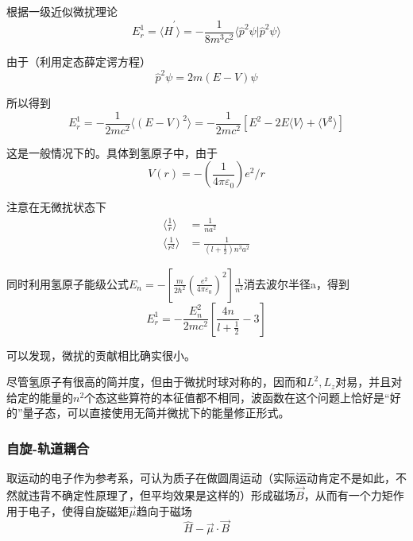 \documentclass[UTF8]{ctexart}
\begin{document}
\noindent 根据一级近似微扰理论
\begin{equation}
    E_r^1 = \langle \hat{H}^{\prime} \rangle = - \frac{1}{8 m^3 c^2} \langle \hat{p}^2\psi | \hat{p}^2 \psi  \rangle  
\end{equation}

\noindent 由于（利用定态薛定谔方程）
\begin{equation}
    \hat{p}^2 \psi = 2m(E-V) \psi 
\end{equation}

\noindent 所以得到
\begin{equation}
    E_r^1 = - \frac{1}{2mc^2} \langle (E-V)^2 \rangle  = -\frac{1}{2mc^2}\left[E^2 - 2E\langle V \rangle +\langle V^2 \rangle \right]
\end{equation}

    这是一般情况下的。具体到氢原子中，由于
    \begin{equation}
        V(r) = - \left(\frac{1}{4 \pi \varepsilon_0}\right) e^2/r
    \end{equation}

\noindent 注意在无微扰状态下
\begin{equation}
    \begin{aligned}
        \langle \frac{1}{r} \rangle  &= \frac{1}{na^2} \\ 
        \langle \frac{1}{r^2} \rangle &= \frac{1}{\left(l+\frac{1}{2}\right) n^3 a^2}
    \end{aligned}
\end{equation}

\noindent 同时利用氢原子能级公式$E_n = -\left[\frac{m}{2\hbar^2}\left(\frac{e^2}{4 \pi \varepsilon_0}\right)^2\right] \frac{1}{n^2}$消去波尔半径a，得到 
\begin{equation}
    E_r^1 = - \frac{E_n^2}{2 m c^2} \left[\frac{4n}{l+\frac{1}{2}} - 3\right]\label{equ6.9}
\end{equation}

\noindent 可以发现，微扰的贡献相比确实很小。

    尽管氢原子有很高的简并度，但由于微扰时球对称的，因而和$L^2,L_z$对易，并且对给定的能量的$n^2$个态这些算符的本征值都不相同，波函数在这个问题上恰好是“好的”量子态，可以直接使用无简并微扰下的能量修正形式。

    \subsubsection{自旋-轨道耦合}
    取运动的电子作为参考系，可认为质子在做圆周运动（实际运动肯定不是如此，不然就违背不确定性原理了，但平均效果是这样的）形成磁场$\vec{B}$，从而有一个力矩作用于电子，使得自旋磁矩$\vec{\mu}$趋向于磁场
    \begin{equation}
        \hat{H} - \vec{\mu} \cdot \vec{B}
    \end{equation}
\end{document}

